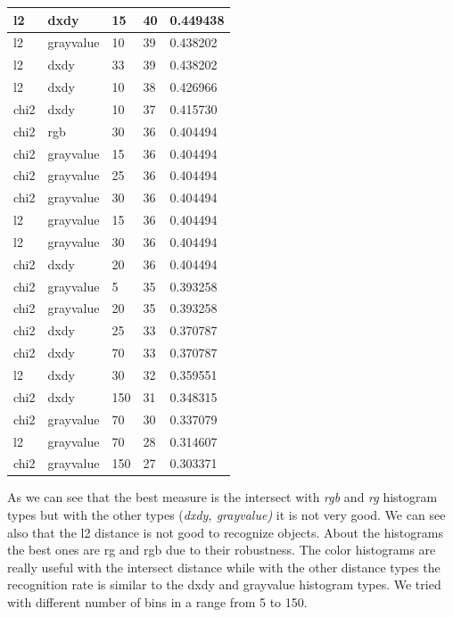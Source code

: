 \documentclass{article}
\begin{document}
\begin{longtable}{|l|l|l|l|l|}
    l2            & dxdy           & 15       & 40      & 0.449438 \\ \hline
    l2            & grayvalue      & 10       & 39      & 0.438202 \\ \hline
    l2            & dxdy           & 33       & 39      & 0.438202 \\ \hline
    l2            & dxdy           & 10       & 38      & 0.426966 \\ \hline
    chi2          & dxdy           & 10       & 37      & 0.415730 \\ \hline
    chi2          & rgb            & 30       & 36      & 0.404494 \\ \hline
    chi2          & grayvalue      & 15       & 36      & 0.404494 \\ \hline
    chi2          & grayvalue      & 25       & 36      & 0.404494 \\ \hline
    chi2          & grayvalue      & 30       & 36      & 0.404494 \\ \hline
    l2            & grayvalue      & 15       & 36      & 0.404494 \\ \hline
    l2            & grayvalue      & 30       & 36      & 0.404494 \\ \hline
    chi2          & dxdy           & 20       & 36      & 0.404494 \\ \hline
    chi2          & grayvalue      & 5        & 35      & 0.393258 \\ \hline
    chi2          & grayvalue      & 20       & 35      & 0.393258 \\ \hline
    chi2          & dxdy           & 25       & 33      & 0.370787 \\ \hline
    chi2          & dxdy           & 70       & 33      & 0.370787 \\ \hline
    l2            & dxdy           & 30       & 32      & 0.359551 \\ \hline 
    chi2          & dxdy           & 150      & 31      & 0.348315 \\ \hline
    chi2          & grayvalue      & 70       & 30      & 0.337079 \\ \hline
    l2            & grayvalue      & 70       & 28      & 0.314607 \\ \hline
    chi2          & grayvalue      & 150      & 27      & 0.303371 \\ \hline
\end{longtable}

\noindent
As we can see that the best measure is the intersect with \textit{rgb} and \textit{rg} histogram types but with the other types (\textit{dxdy, grayvalue)} it is not very good.
We can see also that the l2 distance is not good to recognize objects.
\newline
\newline
About the histograms the best ones are rg and rgb due to their robustness. The color histograms are really useful with the intersect distance while with the other distance types the recognition rate is similar to the dxdy and grayvalue histogram types.
We tried with different number of bins in a range from 5 to 150.
\end{document}
